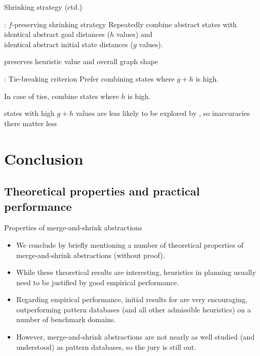 \documentclass{gkibeamer}
\begin{document}
\begin{frame}{Shrinking strategy (ctd.)}
  
  \begin{block}{\hhhh: $f$-preserving shrinking strategy}
    Repeatedly combine abstract states with \\
    \alert{identical} abstract goal distances (\alert{$h$ values}) and \\
    \alert{identical} abstract initial state distances (\alert{$g$
      values}).
  \end{block}
  
  preserves heuristic value and overall graph shape

  \begin{block}{\hhhh: Tie-breaking criterion}
    Prefer combining states where \alert{$g+h$ is high}.

    In case of ties, combine states where \alert{$h$ is high}.
  \end{block}
   states with high $g+h$ values are less likely to
  be explored by \astar, so inaccuracies there matter less
\end{frame}

\section{Conclusion}
\subsection[Properties]{Theoretical properties and practical performance}

\begin{frame}{Properties of merge-and-shrink abstractions}
  \begin{itemize}
  \item We conclude by briefly mentioning a number of
    \alert{theoretical} properties of merge-and-shrink abstractions
    (without proof).
  \item While these theoretical results are interesting, heuristics in
    planning usually need to be justified by good \alert{empirical
      performance}.
  \item Regarding empirical performance, initial results for {\hhhh}
    are \alert{very encouraging}, outperforming pattern databases (and
    all other admissible heuristics) on a number of benchmark domains.
  \item However, merge-and-shrink abstractions are \alert{not nearly
    as well studied} (and understood) as pattern databases, so the
    \alert{jury is still out}.
  \end{itemize}
\end{frame}
\end{document}
